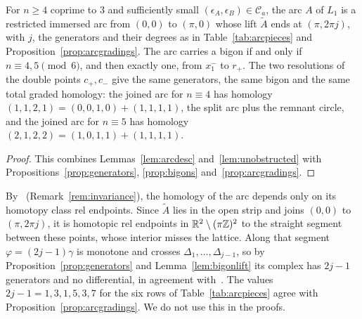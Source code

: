 \begin{theorem}\label{thm:arc}
For $n\ge4$ coprime to $3$ and sufficiently small $(\epsilon_A,\epsilon_B)\in\mathcal C_a$, the arc $A$ of $L_1$ is a restricted immersed arc from $(0,0)$
to $(\pi,0)$ whose lift $\tilde A$ ends at $(\pi,2\pi j)$, with $j$, the generators and their degrees as in
Table~\ref{tab:arcpieces} and Proposition~\ref{prop:arcgradings}. The arc carries a bigon if and only if
$n\equiv4,5\pmod6$, and then exactly one, from $x_1^-$ to $r_+$. The two resolutions of the double points
$c_+,c_-$ give the same generators, the same bigon and the same total graded homology: the joined arc for
$n\equiv4$ has homology $(1,1,2,1)=(0,0,1,0)+(1,1,1,1)$, the split arc plus the remnant circle, and the joined arc
for $n\equiv5$ has homology $(2,1,2,2)=(1,0,1,1)+(1,1,1,1)$.
\end{theorem}

\begin{proof}
This combines Lemmas~\ref{lem:arcdesc} and~\ref{lem:unobstructed} with Propositions~\ref{prop:generators},
\ref{prop:bigons} and~\ref{prop:arcgradings}.
\end{proof}

\begin{remark}\label{rem:homotopycheck}
By~\cite[Thm.~4.1]{HHK2} (Remark~\ref{rem:invariance}), the homology of the arc depends only on its homotopy class
rel endpoints. Since $\tilde A$ lies in the open strip and joins $(0,0)$ to $(\pi,2\pi j)$, it is homotopic rel
endpoints in $\mathbb{R}^2\setminus(\pi\mathbb{Z})^2$ to the straight segment between these points, whose interior misses the
lattice. Along that segment $\varphi=(2j-1)\gamma$ is monotone and crosses $\Delta_1,\dots,\Delta_{j-1}$, so by
Proposition~\ref{prop:generators} and Lemma~\ref{lem:bigonlift} its complex has $2j-1$ generators and no
differential, in agreement with~\cite[Thm.~7.1]{HHK2}. The values $2j-1=1,3,1,5,3,7$ for the six rows of
Table~\ref{tab:arcpieces} agree with Proposition~\ref{prop:arcgradings}. We do not use this in the proofs.
\end{remark}

